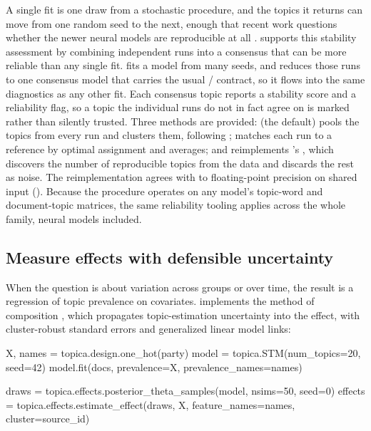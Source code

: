\documentclass[article]{jss}
\begin{document}
A single fit is one draw from a stochastic procedure, and the topics it returns
can move from one random seed to the next, enough that recent work questions
whether the newer neural models are reproducible at all \citep{hoyle2022broken}.
 supports this stability assessment by combining independent runs
into a consensus that can be more reliable than any single fit.
 fits a model from
many seeds, and  reduces those runs to one consensus model
that carries the usual / contract, so it flows
into the same diagnostics as any other fit. Each consensus topic reports a
stability score and a reliability flag, so a topic the individual runs do not in
fact agree on is marked rather than silently trusted. Three methods are provided:
 (the default) pools the topics from every run and clusters them,
following \citet{hoyle2022broken};  matches each run to a reference by
optimal assignment and averages; and  reimplements 's
 \citep{rehurek2010gensim}, which discovers the number of
reproducible topics from the data and discards the rest as noise. The
reimplementation agrees with  to floating-point precision on shared
input (). Because the procedure
operates on any model's topic-word and document-topic matrices, the same
reliability tooling applies across the whole family, neural models included.

\subsection{Measure effects with defensible uncertainty}

When the question is about variation across groups or over time, the result is a
regression of topic prevalence on covariates.  implements the method
of composition \citep{roberts2016model}, which propagates topic-estimation
uncertainty into the effect, with cluster-robust standard errors and generalized
linear model links:

\begin{CodeChunk}
\begin{CodeInput}
X, names = topica.design.one_hot(party)
model = topica.STM(num_topics=20, seed=42)
model.fit(docs, prevalence=X, prevalence_names=names)

draws   = topica.effects.posterior_theta_samples(model, nsims=50, seed=0)
effects = topica.effects.estimate_effect(draws, X, feature_names=names, cluster=source_id)
\end{CodeInput}
\end{CodeChunk}
\end{document}
